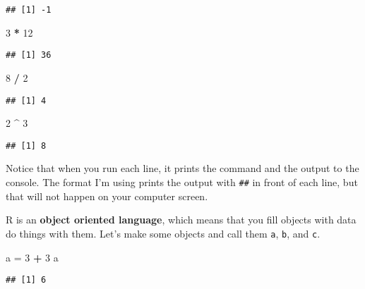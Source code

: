 \documentclass[]{book}
\newenvironment{Shaded}{\begin{snugshade}}{\end{snugshade}}
\newcommand{\DecValTok}[1]{\textcolor[rgb]{0.00,0.00,0.81}{#1}}
\newcommand{\StringTok}[1]{\textcolor[rgb]{0.31,0.60,0.02}{#1}}
\newcommand{\OperatorTok}[1]{\textcolor[rgb]{0.81,0.36,0.00}{\textbf{#1}}}
\newcommand{\NormalTok}[1]{#1}
\theoremstyle{definition}
\theoremstyle{definition}
\theoremstyle{definition}
\theoremstyle{remark}
\begin{document}
\begin{verbatim}
## [1] -1
\end{verbatim}

\begin{Shaded}
\begin{Highlighting}[]
\DecValTok{3} \OperatorTok{*}\StringTok{ }\DecValTok{12}
\end{Highlighting}
\end{Shaded}

\begin{verbatim}
## [1] 36
\end{verbatim}

\begin{Shaded}
\begin{Highlighting}[]
\DecValTok{8} \OperatorTok{/}\StringTok{ }\DecValTok{2}
\end{Highlighting}
\end{Shaded}

\begin{verbatim}
## [1] 4
\end{verbatim}

\begin{Shaded}
\begin{Highlighting}[]
\DecValTok{2} \OperatorTok{^}\StringTok{ }\DecValTok{3}
\end{Highlighting}
\end{Shaded}

\begin{verbatim}
## [1] 8
\end{verbatim}

Notice that when you run each line, it prints the command and the output
to the console. The format I'm using prints the output with
\texttt{\#\#} in front of each line, but that will not happen on your
computer screen.

R is an \textbf{object oriented language}, which means that you fill
objects with data do things with them. Let's make some objects and call
them \texttt{a}, \texttt{b}, and \texttt{c}.

\begin{Shaded}
\begin{Highlighting}[]
\NormalTok{a =}\StringTok{ }\DecValTok{3} \OperatorTok{+}\StringTok{ }\DecValTok{3}
\NormalTok{a}
\end{Highlighting}
\end{Shaded}

\begin{verbatim}
## [1] 6
\end{verbatim}
\end{document}
